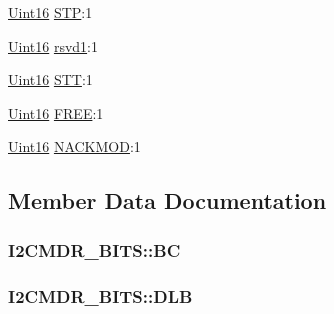 \begin{DoxyCompactItemize}
\item 
\hyperlink{_d_s_p2833x___device_8h_a59a9f6be4562c327cbfb4f7e8e18f08b}{Uint16} \hyperlink{struct_i2_c_m_d_r___b_i_t_s_aeea5016b61fb54077daa68406f7342e9}{S\+T\+P}\+:1
\item 
\hyperlink{_d_s_p2833x___device_8h_a59a9f6be4562c327cbfb4f7e8e18f08b}{Uint16} \hyperlink{struct_i2_c_m_d_r___b_i_t_s_a39c7a9b1c505bbfb8a37d72e7fb43ceb}{rsvd1}\+:1
\item 
\hyperlink{_d_s_p2833x___device_8h_a59a9f6be4562c327cbfb4f7e8e18f08b}{Uint16} \hyperlink{struct_i2_c_m_d_r___b_i_t_s_aa31032cc97070b4406a2d5c851998338}{S\+T\+T}\+:1
\item 
\hyperlink{_d_s_p2833x___device_8h_a59a9f6be4562c327cbfb4f7e8e18f08b}{Uint16} \hyperlink{struct_i2_c_m_d_r___b_i_t_s_ab1acd800dfd6b72ba2ed7e9ea20698c5}{F\+R\+E\+E}\+:1
\item 
\hyperlink{_d_s_p2833x___device_8h_a59a9f6be4562c327cbfb4f7e8e18f08b}{Uint16} \hyperlink{struct_i2_c_m_d_r___b_i_t_s_ae306bed748642cde2482e23ae57d0d70}{N\+A\+C\+K\+M\+O\+D}\+:1
\end{DoxyCompactItemize}


\subsection{Member Data Documentation}
\hypertarget{struct_i2_c_m_d_r___b_i_t_s_a005c24db7747ea44ee2da76aa5958e4b}{}
\subsubsection[{B\+C}]{ I2\+C\+M\+D\+R\+\_\+\+B\+I\+T\+S\+::\+B\+C}\label{struct_i2_c_m_d_r___b_i_t_s_a005c24db7747ea44ee2da76aa5958e4b}
\hypertarget{struct_i2_c_m_d_r___b_i_t_s_a171781eed0b9afce6216f0266f4296d9}{}
\subsubsection[{D\+L\+B}]{ I2\+C\+M\+D\+R\+\_\+\+B\+I\+T\+S\+::\+D\+L\+B}\label{struct_i2_c_m_d_r___b_i_t_s_a171781eed0b9afce6216f0266f4296d9}
\hypertarget{struct_i2_c_m_d_r___b_i_t_s_a7de6595878a572f43019b790716b05ab}{}
